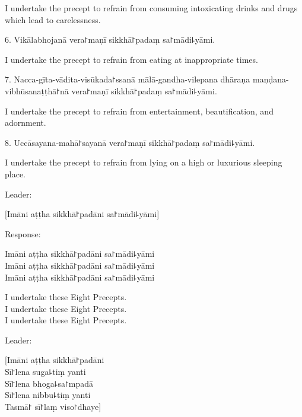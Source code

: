 \begin{english}
  I undertake the precept to refrain from consuming intoxicating drinks and drugs which lead to carelessness.
\end{english}

6. Vikālabhojanā vera꜓maṇī sikkhā꜓padaṃ sa꜓mādi꜕yāmi.

\begin{english}
  I undertake the precept to refrain from eating at inappropriate times.
\end{english}

7. Nacca-gīta-vādita-visūkada꜓ssanā mālā-gandha-vilepana dhāraṇa maṇḍana-vibhūsanaṭṭhā꜓nā vera꜓maṇī sikkhā꜓padaṃ sa꜓mādi꜕yāmi.

\begin{english}
  I undertake the precept to refrain from entertainment, beautification, and adornment.
\end{english}

8. Uccāsayana-mahā꜓sayanā vera꜓maṇī sikkhā꜓padaṃ sa꜓mādi꜕yāmi.

\begin{english}
  I undertake the precept to refrain from lying on a high or luxurious sleeping place.
\end{english}

\begin{instruction}
  Leader:
\end{instruction}

[Imāni aṭṭha sikkhā꜓padāni sa꜓mādi꜕yāmi]

\begin{instruction}
  Response:
\end{instruction}

Imāni aṭṭha sikkhā꜓padāni sa꜓mādi꜕yāmi\\
Imāni aṭṭha sikkhā꜓padāni sa꜓mādi꜕yāmi\\
Imāni aṭṭha sikkhā꜓padāni sa꜓mādi꜕yāmi

\begin{english}
  I undertake these Eight Precepts.\\
  I undertake these Eight Precepts.\\
  I undertake these Eight Precepts.
\end{english}

\clearpage

\begin{instruction}
  Leader:
\end{instruction}

[Imāni aṭṭha sikkhā꜓padāni\\
Sī꜓lena suga꜕tiṃ yanti\\
Sī꜓lena bhoga꜕sa꜓mpadā\\
Sī꜓lena nibbu꜕tiṃ yanti\\
Tasmā꜓ sī꜓laṃ viso꜓dhaye]

